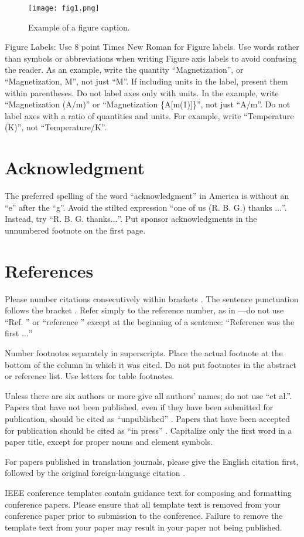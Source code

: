 \documentclass[conference]{IEEEtran}
\begin{document}
\begin{figure}[htbp]
\centerline{\texttt{[image: fig1.png]}}
\caption{Example of a figure caption.}
\label{fig}
\end{figure}

Figure Labels: Use 8 point Times New Roman for Figure labels. Use words 
rather than symbols or abbreviations when writing Figure axis labels to 
avoid confusing the reader. As an example, write the quantity 
``Magnetization'', or ``Magnetization, M'', not just ``M''. If including 
units in the label, present them within parentheses. Do not label axes only 
with units. In the example, write ``Magnetization (A/m)'' or ``Magnetization 
\{A[m(1)]\}'', not just ``A/m''. Do not label axes with a ratio of 
quantities and units. For example, write ``Temperature (K)'', not 
``Temperature/K''.

\section*{Acknowledgment}

The preferred spelling of the word ``acknowledgment'' in America is without 
an ``e'' after the ``g''. Avoid the stilted expression ``one of us (R. B. 
G.) thanks $\ldots$''. Instead, try ``R. B. G. thanks$\ldots$''. Put sponsor 
acknowledgments in the unnumbered footnote on the first page.

\section*{References}

Please number citations consecutively within brackets \cite{b1}. The 
sentence punctuation follows the bracket \cite{b2}. Refer simply to the reference 
number, as in \cite{b3}---do not use ``Ref. \cite{b3}'' or ``reference \cite{b3}'' except at 
the beginning of a sentence: ``Reference \cite{b3} was the first $\ldots$''

Number footnotes separately in superscripts. Place the actual footnote at 
the bottom of the column in which it was cited. Do not put footnotes in the 
abstract or reference list. Use letters for table footnotes.

Unless there are six authors or more give all authors' names; do not use 
``et al.''. Papers that have not been published, even if they have been 
submitted for publication, should be cited as ``unpublished'' \cite{b4}. Papers 
that have been accepted for publication should be cited as ``in press'' \cite{b5}. 
Capitalize only the first word in a paper title, except for proper nouns and 
element symbols.

For papers published in translation journals, please give the English 
citation first, followed by the original foreign-language citation \cite{b6}.

\vspace{12pt}
\color{red}
IEEE conference templates contain guidance text for composing and formatting conference papers. Please ensure that all template text is removed from your conference paper prior to submission to the conference. Failure to remove the template text from your paper may result in your paper not being published.
\fi



\end{document}
